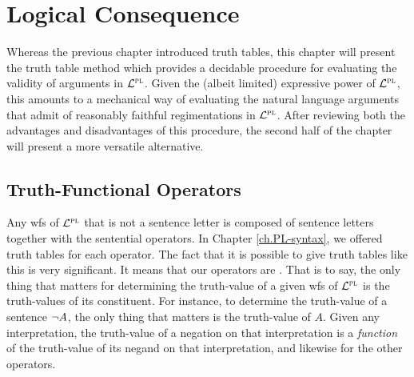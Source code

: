 \chapter{Logical Consequence}
\label{ch.PL-semantics}

Whereas the previous chapter introduced truth tables, this chapter will present the truth table method which provides a decidable procedure for evaluating the validity of arguments in $\mathcal{L}^{\textsc{pl}}$.
Given the (albeit limited) expressive power of $\mathcal{L}^{\textsc{pl}}$, this amounts to a mechanical way of evaluating the natural language arguments that admit of reasonably faithful regimentations in $\mathcal{L}^{\textsc{pl}}$.
After reviewing both the advantages and disadvantages of this procedure, the second half of the chapter will present a more versatile alternative.




\section{Truth-Functional Operators}

Any wfs of $\mathcal{L}^{\textsc{pl}}$ that is not a sentence letter is composed of sentence letters together with the sentential operators.
In Chapter \ref{ch.PL-syntax}, we offered truth tables for each operator.
The fact that it is possible to give truth tables like this is very significant.
It means that our operators are .
That is to say, the only thing that matters for determining the truth-value of a given wfs of $\mathcal{L}^{\textsc{pl}}$ is the truth-values of its constituent.
For instance, to determine the truth-value of a sentence $\neg A$, the only thing that matters is the truth-value of $A$.
Given any interpretation, the truth-value of a negation on that interpretation is a \textit{function} of the truth-value of its negand on that interpretation, and likewise for the other operators.

